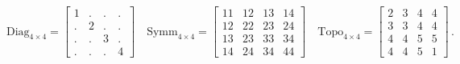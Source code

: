 \begin{equation*}
\scriptstyle
\mbox{Diag}_{4 \times 4} =
\left[
\begin{array}{rrrr}
  1 & . & . & . \\ 
  . & 2 & . & . \\ 
  . & . & 3 & . \\ 
  . & . & . & 4  
\end{array}
\right]
\quad
%
\mbox{Symm}_{4 \times 4} =
\left[
\begin{array}{rrrr}
  11 & 12 & 13 & 14 \\ 
  12 & 22 & 23 & 24 \\ 
  13 & 23 & 33 & 34 \\ 
  14 & 24 & 34 & 44  
\end{array}
\right]
\quad
%
\mbox{Topo}_{4 \times 4} =
\left[
\begin{array}{rrrr}
  2 & 3 & 4 & 4 \\ 
  3 & 3 & 4 & 4 \\ 
  4 & 4 & 5 & 5 \\ 
  4 & 4 & 5 & 1 
\end{array}
\right]
\period
\end{equation*}

